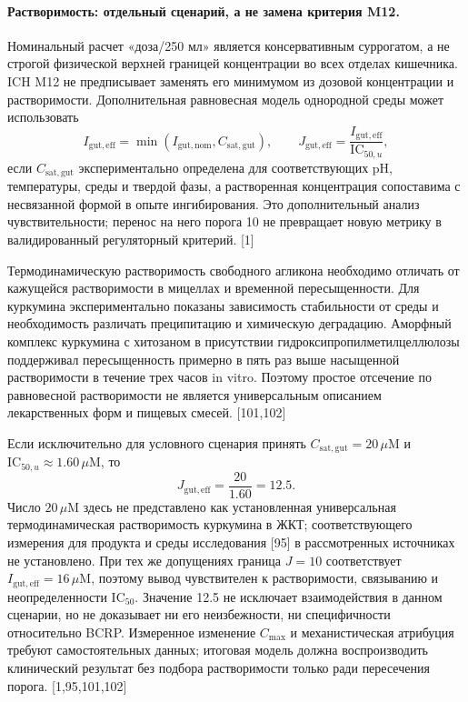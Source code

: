\documentclass[11pt]{article}
\begin{document}
\paragraph{Растворимость: отдельный сценарий, а не замена критерия M12.}
Номинальный расчет «доза/250 мл» является консервативным суррогатом, а не строгой физической верхней границей концентрации во всех отделах кишечника. ICH M12 не предписывает заменять его минимумом из дозовой концентрации и растворимости. Дополнительная равновесная модель однородной среды может использовать
\[
I_{\mathrm{gut,eff}}=
\min\!\left(I_{\mathrm{gut,nom}},C_{\mathrm{sat,gut}}\right),
\qquad
J_{\mathrm{gut,eff}}=
\frac{I_{\mathrm{gut,eff}}}{\mathrm{IC}_{50,u}},
\]
если \(C_{\mathrm{sat,gut}}\) экспериментально определена для соответствующих pH, температуры, среды и твердой фазы, а растворенная концентрация сопоставима с несвязанной формой в опыте ингибирования. Это дополнительный анализ чувствительности; перенос на него порога 10 не превращает новую метрику в валидированный регуляторный критерий. [1]

Термодинамическую растворимость свободного агликона необходимо отличать от кажущейся растворимости в мицеллах и временной пересыщенности. Для куркумина экспериментально показаны зависимость стабильности от среды и необходимость различать преципитацию и химическую деградацию. Аморфный комплекс куркумина с хитозаном в присутствии гидроксипропилметилцеллюлозы поддерживал пересыщенность примерно в пять раз выше насыщенной растворимости в течение трех часов in vitro. Поэтому простое отсечение по равновесной растворимости не является универсальным описанием лекарственных форм и пищевых смесей. [101,102]

Если исключительно для условного сценария принять \(C_{\mathrm{sat,gut}}=20\,\mu\mathrm{M}\) и \(\mathrm{IC}_{50,u}\approx1.60\,\mu\mathrm{M}\), то
\[
J_{\mathrm{gut,eff}}=\frac{20}{1.60}=12.5.
\]
Число \(20\,\mu\mathrm{M}\) здесь не представлено как установленная универсальная термодинамическая растворимость куркумина в ЖКТ; соответствующего измерения для продукта и среды исследования [95] в рассмотренных источниках не установлено. При тех же допущениях граница \(J=10\) соответствует \(I_{\mathrm{gut,eff}}=16\,\mu\mathrm{M}\), поэтому вывод чувствителен к растворимости, связыванию и неопределенности \(\mathrm{IC}_{50}\). Значение 12.5 не исключает взаимодействия в данном сценарии, но не доказывает ни его неизбежности, ни специфичности относительно BCRP. Измеренное изменение \(C_{\max}\) и механистическая атрибуция требуют самостоятельных данных; итоговая модель должна воспроизводить клинический результат без подбора растворимости только ради пересечения порога. [1,95,101,102]
\end{document}
